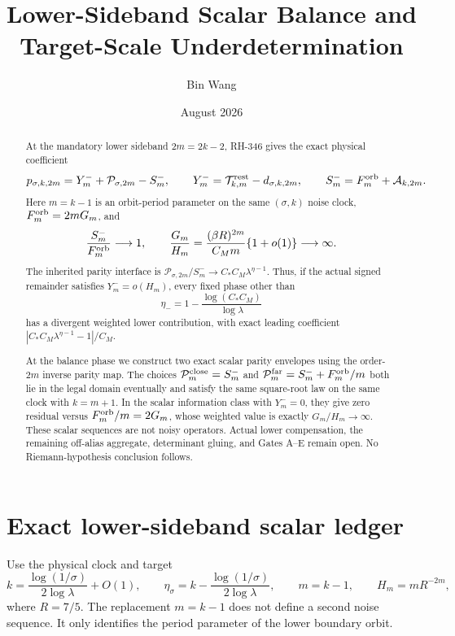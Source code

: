 \documentclass[11pt]{article}
\title{Lower-Sideband Scalar Balance and\\
Target-Scale Underdetermination}
\author{Bin Wang}
\date{August 2026}
\theoremstyle{remark}
\newcommand{\cP}{\mathcal P}
\newcommand{\cA}{\mathcal A}
\newcommand{\cT}{\mathcal T}
\begin{document}
\maketitle

\begin{abstract}
At the mandatory lower sideband $2m=2k-2$, RH-346 gives the exact physical
coefficient
\[
 p_{\sigma,k,2m}=Y_m^-+\cP_{\sigma,2m}-S_m^-,
 \qquad
 Y_m^-=\cT_{k,m}^{\rm rest}-d_{\sigma,k,2m},
 \qquad
 S_m^-=F_m^{\rm orb}+\cA_{k,2m}.
\]
Here $m=k-1$ is an orbit-period parameter on the same $(\sigma,k)$ noise
clock, $F_m^{\rm orb}=2mG_m$, and
\[
 \frac{S_m^-}{F_m^{\rm orb}}\longrightarrow1,\qquad
 \frac{G_m}{H_m}
 =\frac{(\beta R)^{2m}}{C_Mm}\{1+o(1)\}\longrightarrow\infty.
\]
The inherited parity interface is
$\cP_{\sigma,2m}/S_m^-\to C_*C_M\lambda^{\eta-1}$.  Thus, if the actual
signed remainder satisfies $Y_m^-=o(H_m)$, every fixed phase other than
\[
 \eta_-=1-\frac{\log(C_*C_M)}{\log\lambda}
\]
has a divergent weighted lower contribution, with exact leading coefficient
$|C_*C_M\lambda^{\eta-1}-1|/C_M$.

At the balance phase we construct two exact scalar parity envelopes using
the order-$2m$ inverse parity map.  The choices
$\cP_m^{\rm close}=S_m^-$ and
$\cP_m^{\rm far}=S_m^-+F_m^{\rm orb}/m$ both lie in the legal domain
eventually and satisfy the same square-root law on the same clock with
$k=m+1$.  In the scalar information class with $Y_m^-=0$, they give zero
residual versus $F_m^{\rm orb}/m=2G_m$, whose weighted value is exactly
$G_m/H_m\to\infty$.  These scalar sequences are not noisy operators.
Actual lower compensation, the remaining off-alias aggregate, determinant
gluing, and Gates A--E remain open.  No Riemann-hypothesis conclusion follows.
\end{abstract}

\section{Exact lower-sideband scalar ledger}

Use the physical clock and target
\begin{equation}\label{eq:clock}
 k=\frac{\log(1/\sigma)}{2\log\lambda}+O(1),\qquad
 \eta_\sigma=k-\frac{\log(1/\sigma)}{2\log\lambda},\qquad
 m=k-1,\qquad H_m=mR^{-2m},
\end{equation}
where $R=7/5$.  The replacement $m=k-1$ does not define a second noise
sequence.  It only identifies the period parameter of the lower boundary
orbit.
\end{document}
